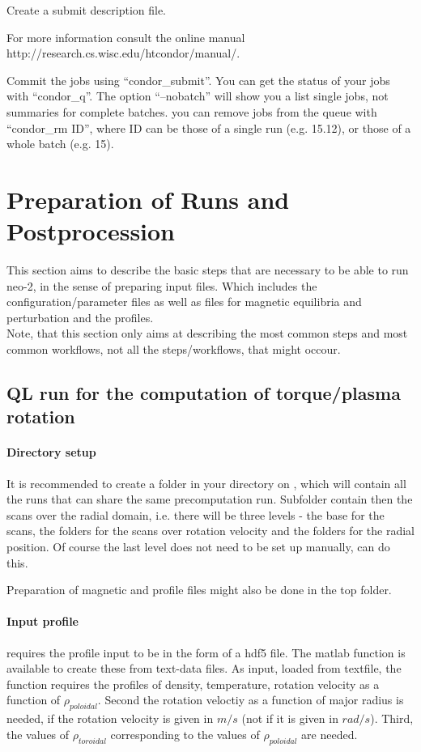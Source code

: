 Create a submit description file.

For more information consult the online manual http://research.cs.wisc.edu/htcondor/manual/.

Commit the jobs using ``condor\_submit''.
You can get the status of your jobs with ``condor\_q''. The option
``--nobatch'' will show you a list single jobs, not summaries for
complete batches.
you can remove jobs from the queue with ``condor\_rm ID'', where ID can
be those of a single run (e.g. 15.12), or those of a whole batch (e.g.
15).

\section{Preparation of Runs and Postprocession}
This section aims to describe the basic steps that are necessary to be
able to run neo-2, in the sense of preparing input files. Which includes
the configuration/parameter files as well as files for magnetic
equilibria and perturbation and the profiles.\\
Note, that this section only aims at describing the most common steps
and most common workflows, not all the steps/workflows, that might
occour.

\subsection{QL run for the computation of torque/plasma rotation}

\paragraph{Directory setup}
It is recommended to create a folder in your directory on ,
which will contain all the runs that can share the same precomputation
run. Subfolder contain then the scans over the radial domain, i.e. there
will be three levels - the base for the scans, the folders for the scans
over rotation velocity and the folders for the radial position. Of
course the last level does not need to be set up manually, \neotwo can
do this.

Preparation of magnetic and profile files might also be done in the top
folder.

\paragraph{Input profile}
\neotwo requires the profile input to be in the form of a hdf5 file. The
matlab function  is available to create
these from text-data files. As input, loaded from textfile, the function
requires the profiles of density, temperature, rotation velocity as a
function of $\rho_{poloidal}$. Second the rotation veloctiy as a
function of major radius is needed, if the rotation velocity is given in
$m/s$ (not if it is given in $rad/s$). Third, the values of
$\rho_{toroidal}$ corresponding to the values of $\rho_{poloidal}$ are
needed.

